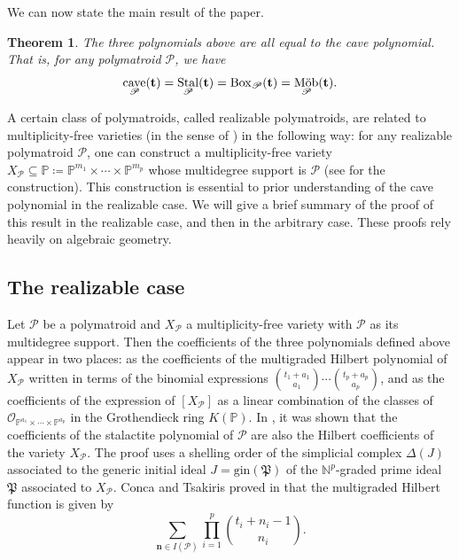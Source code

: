 \documentclass[a4paper, 11pt]{amsart}
\newtheorem{theorem}{Theorem}[section]
\theoremstyle{definition}
\newcommand{\bfn}{\mathbf{n}}
\newcommand{\bft}{\mathbf{t}}
\newcommand{\sP}{\mathscr{P}}
\newcommand{\N}{\mathbb{N}}
\newcommand{\PP}{\mathbb{P}}
\DeclareMathOperator{\cave}{cave}
\DeclareMathOperator{\Stal}{Stal}
\DeclareMathOperator{\Mob}{\textnormal{M\"ob}}
\begin{document}

We can now state the main result of the paper. 
\begin{theorem}\label{thm:equality}
    The three polynomials above are all equal to the cave polynomial. That is, for any polymatroid $\sP$, we have 
    \[\cave_{\sP}(\bft) = \Stal_{\sP}(\bft) = \mathrm{Box}_{\sP}(\bft) = \Mob_{\sP}(\bft).\]
\end{theorem}

A certain class of polymatroids, called realizable polymatroids, are related to multiplicity-free varieties (in the sense of \cite{Brion}) in the following way: for any realizable polymatroid $\sP$, one can construct a multiplicity-free variety $X_\sP \subseteq \PP \coloneqq \PP^{m_1} \times \cdots \times \PP^{m_p} $ whose multidegree support is $\sP$ (see \cite[proof of Proposition 7.15]{CCRMM} for the construction). This construction is essential to prior understanding of the cave polynomial in the realizable case. We will give a brief summary of the proof of this result in the realizable case, and then in the arbitrary case. These proofs rely heavily on algebraic geometry. 

\subsection{The realizable case}\label{sec:realizable}

Let $\sP$ be a polymatroid and $X_\sP$ a multiplicity-free variety with $\sP$ as its multidegree support. Then the coefficients of the three polynomials defined above appear in two places:  as the coefficients of the multigraded Hilbert polynomial of $X_\sP$ written in terms of the binomial expressions $\binom{t_1+a_1}{a_1}\cdots\binom{t_p+a_p}{a_p}$, and  as the coefficients of the expression of $[X_\sP]$ as a linear combination of the classes of $\mathcal{O}_{\PP^{a_1} \times \cdots \times \PP^{a_p}}$  in the Grothendieck ring $K(\PP)$. In \cite[Theorem 6.9]{CCRMM}, it was shown that the coefficients of the stalactite polynomial of $\sP$ are also the Hilbert coefficients of the variety $X_\sP$. The proof uses a shelling order of the simplicial complex $\Delta(J)$ associated to the generic initial ideal $J = \mathrm{gin}(\mathfrak{P})$ of the $\N^p$-graded prime ideal $\mathfrak{P}$ associated to $X_\sP$. Conca and Tsakiris proved in \cite[Theorem 3.9]{ConcaTsakiris} that the multigraded Hilbert function is given by 
\[\sum_{\mathbf{n} \in I(\sP)}\prod_{i=1}^p\binom{t_i+n_i-1}{n_i}.\]
\end{document}
